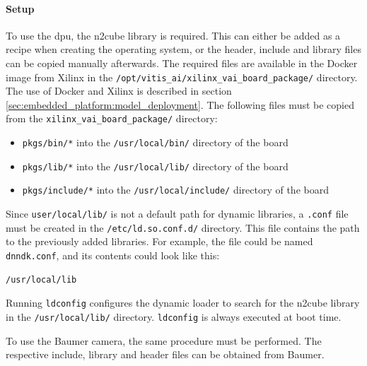 \paragraph{Setup}
To use the \acrshort{dpu}, the \acrshort{n2cube} library is required.
This can either be added as a recipe when creating the operating system, or the header, include and library files can be copied manually afterwards.
The required files are available in the Docker image from Xilinx in the \texttt{/opt/vitis\_ai/xilinx\_vai\_board\_package/} directory.
The use of Docker and Xilinx is described in section \ref{sec:embedded_platform:model_deployment}.
The following files must be copied from the \texttt{xilinx\_vai\_board\_package/} directory:
\begin{itemize}
  \item \texttt{pkgs/bin/*} into the \texttt{/usr/local/bin/} directory of the board
  \item \texttt{pkgs/lib/*} into the \texttt{/usr/local/lib/} directory of the board
  \item \texttt{pkgs/include/*} into the \texttt{/usr/local/include/} directory of the board
\end{itemize}

Since \texttt{user/local/lib/} is not a default path for dynamic libraries, a \texttt{.conf} file must be created in the \texttt{/etc/ld.so.conf.d/} directory.
This file contains the path to the previously added libraries.
For example, the file could be named \texttt{dnndk.conf}, and its contents could look like this:
\begin{lstlisting}[style=bash, caption={}, label=lst:dnndk_conf_content]
  /usr/local/lib
\end{lstlisting}
Running \texttt{ldconfig} configures the dynamic loader to search for the \acrshort{n2cube} library in the \texttt{/usr/local/lib/} directory.
\texttt{ldconfig} is always executed at boot time.

To use the Baumer camera, the same procedure must be performed.
The respective include, library and header files can be obtained from Baumer.
